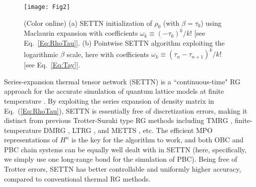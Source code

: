 \documentclass[aps,prx,twocolumn,showpacs,psfig,superscriptaddress,longbibliography]{revtex4-1}
\newcommand{\Eq}[1]{Eq.~\eqref{#1}}
\def\taui{\tau_0}
\begin{document}
\begin{figure}[tbp]
\texttt{[image: Fig2]}
\caption{(Color online)
   (a) SETTN initialization of $\rho_0$ (with $\beta=\taui$)
   using Maclaurin expansion with coefficients $\omega_k
   \equiv (-\taui)^k / k!$ [see \Eq{Eq:RhoTau}].  (b)
   Pointwise SETTN algorithm exploiting the logarithmic
   $\beta$ scale, here with coefficients $\omega_k \equiv
   (\tau_n - \tau_{n+1})^k / k!$ [see \Eq{Eq:Tay}].
}
\label{Fig:SETTNAlg}
\end{figure}

Series-expansion thermal tensor network (SETTN) is a
``continuous-time" RG approach for the accurate simulation of
quantum lattice models at finite temperature
\cite{Chen.b+:2017:SETTN}. By exploiting the series expansion of
density matrix in Eq.~(\ref{Eq:RhoTau}), SETTN is essentially free
of discretization errors, making it distinct from previous
Trotter-Suzuki type RG methods including TMRG
\cite{Wang.x+:1997:TMRG, Xiang.t:1998:Thermodynamics},
finite-temperature DMRG \cite{Feiguin.a.e+:2005:ftDMRG}, LTRG
\cite{Li.w+:2011:LTRG, Ran.s+:2012:Super-orthogonalization,
Dong.y+:2017:BiLTRG}, and METTS \cite{White.s.r:2009:METTS}, etc.
The efficient MPO representations of $H^n$ is the key for the
algorithm to work, and both OBC and PBC chain systems can be equally
well dealt with in SETTN (here, specifically, we simply use one
long-range bond for the simulation of PBC).  Being free of Trotter
errors, SETTN has better controllable and uniformly higher accuracy,
compared to conventional thermal RG methods. 
\end{document}
